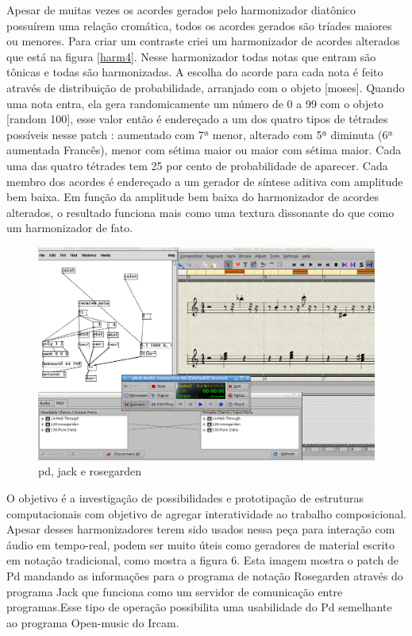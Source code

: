 \documentclass[draft]{ppgmus}
\begin{document}
Apesar de muitas vezes os acordes gerados pelo harmonizador diatônico possuírem uma relação 
cromática, todos os acordes gerados são tríades maiores ou menores. Para criar um contraste 
criei um harmonizador de acordes alterados que está na figura \ref{harm4}. Nesse harmonizador todas notas 
que entram são tônicas e todas são harmonizadas. 
	A escolha do acorde para cada nota é feito através de distribuição de probabilidade, 
arranjado com o objeto [moses]. Quando uma nota entra, ela gera randomicamente um número de 0 
a 99 com o objeto [random 100], esse valor então é endereçado a um dos quatro tipos de tétrades 
possíveis nesse patch : aumentado com 7ª menor, alterado com 5ª diminuta (6ª aumentada Francês), 
menor com sétima maior ou maior com sétima maior. Cada uma das quatro tétrades tem 25 por cento 
de probabilidade de aparecer. Cada membro dos acordes é endereçado a um gerador de síntese aditiva 
com amplitude bem baixa. Em função da amplitude bem baixa do harmonizador de acordes alterados, o 
resultado funciona mais como uma textura dissonante do que como um harmonizador de fato.



\begin{figure}
\includegraphics[scale=.4]{harm5}
\caption{pd, jack e rosegarden}
\label{harm5}
\end{figure}

O objetivo é a investigação de possibilidades e prototipação de estruturas computacionais com 
objetivo de agregar interatividade ao trabalho composicional.  
	Apesar desses harmonizadores terem sido usados nessa peça para interação com áudio em 
tempo-real, podem ser muito úteis como geradores de material escrito em notação tradicional, 
como mostra a figura 6. Esta imagem mostra o patch de Pd mandando as informações para o programa 
de notação Rosegarden através do programa Jack que funciona como um servidor de comunicação entre 
programas.Esse tipo de operação possibilita uma usabilidade do Pd semelhante ao programa Open-music 
do Ircam.
\end{document}
